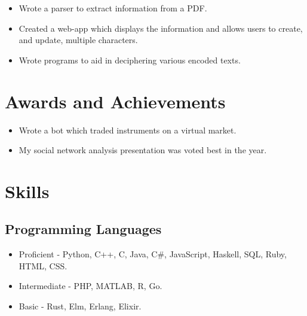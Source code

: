 \documentclass{jcgcv}
\begin{document}
\begin{column}
\begin{itemize}
  \item Wrote a parser to extract information from a PDF.
  \item Created a web-app which displays the information and allows users to create, and update, multiple characters.
\end{itemize}

\begin{itemize}
  \item Wrote programs to aid in deciphering various encoded texts.
\end{itemize}



\section{Awards and Achievements}

\begin{itemize}
  \item Wrote a bot which traded instruments on a virtual market.
\end{itemize}

\begin{itemize}
  \item My social network analysis presentation was voted best in the year.
\end{itemize}



\section{Skills}

\subsection{Programming Languages}
\begin{itemize}
  \item Proficient - Python, C++, C, Java, C\#, JavaScript, Haskell, SQL, Ruby, HTML, CSS.
  \item Intermediate - PHP, MATLAB, R, Go.
  \item Basic - Rust, Elm, Erlang, Elixir.
\end{itemize}


\end{column}
\end{document}
